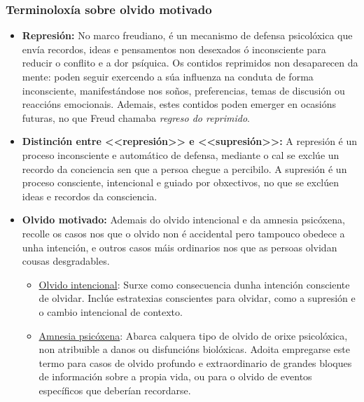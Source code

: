\documentclass[a4paper,11pt]{article}
\begin{document}
\subsubsection{Terminoloxía sobre olvido motivado}
\begin{itemize}
	\item \textbf{Represión:} No marco freudiano, é un mecanismo de defensa psicolóxica que envía 
	recordos, ideas e pensamentos non desexados ó inconsciente para reducir o conflito e a dor 
	psíquica. Os contidos reprimidos non desaparecen da mente: poden seguir exercendo a súa 
	influenza na conduta de forma inconsciente, manifestándose nos soños, preferencias, temas de 
	discusión ou reaccións emocionais. Ademais, estes contidos poden emerger en ocasións futuras, no 
	que Freud chamaba \textit{regreso do reprimido}.
	\item \textbf{Distinción entre <<represión>> e <<supresión>>:} A represión é un proceso 
	inconsciente e automático de defensa, mediante o cal se exclúe un recordo da conciencia sen que 
	a persoa chegue a percibilo. A supresión é un proceso consciente, intencional e guiado por 
	obxectivos, no que se exclúen ideas e recordos da consciencia. 
	\item \textbf{Olvido motivado:} Ademais do olvido intencional e da amnesia psicóxena, recolle os 
	casos nos que o olvido non é accidental pero tampouco obedece a unha intención, e outros casos 
	máis ordinarios nos que as persoas olvidan cousas desgradables.
	\begin{itemize}
		\item \underline{Olvido intencional}: Surxe como consecuencia dunha intención consciente de 
		olvidar. Inclúe estratexias conscientes para olvidar, como a supresión e o cambio 
		intencional de contexto.
		\item \underline{Amnesia psicóxena}: Abarca calquera tipo de olvido de orixe psicolóxica, 
		non atribuible a danos ou disfuncións biolóxicas. Adoita empregarse este termo para casos de 
		olvido profundo e extraordinario de grandes bloques de información sobre a propia vida, ou 
		para o olvido de eventos específicos que deberían recordarse. 
	\end{itemize}
\end{itemize}
\end{document}
